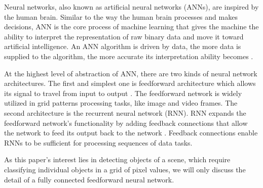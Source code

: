 Neural networks, also known as artificial neural networks (ANNs), are inspired by the human brain. Similar to the way the human brain processes and makes decisions, ANN is the core process of machine learning that gives the machine the ability to interpret the representation of raw binary data and move it toward artificial intelligence. An ANN algorithm is driven by data, the more data is supplied to the algorithm, the more accurate its interpretation ability becomes \cite{ai_data_driven}.

At the highest level of abstraction of ANN, there are two kinds of neural network architectures. The first and simplest one is feedforward architecture which allows its signal to travel from input to output \cite{lecun2015deep}. The feedforward network is widely utilized in grid patterns processing tasks, like image and video frames. The second architecture is the recurrent neural network (RNN). RNN expands the feedforward network's functionality by adding feedback connections that allow the network to feed its output back to the network \cite{lecun2015deep}. Feedback connections enable RNNs to be sufficient for processing sequences of data tasks.

As this paper's interest lies in detecting objects of a scene, which require classifying individual objects in a grid of pixel values, we will only discuss the detail of a fully connected feedforward neural network.



